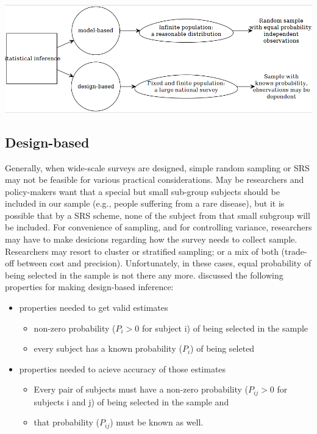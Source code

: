 \documentclass[
]{book}
\providecommand{\tightlist}{%
  \setlength{\itemsep}{0pt}\setlength{\parskip}{0pt}}
\begin{document}
\includegraphics[width=0.85\linewidth]{images/design1}

\hypertarget{design-based}{%
\subsection{Design-based}\label{design-based}}

Generally, when wide-scale surveys are designed, simple random sampling or SRS may not be feasible for various practical considerations. May be researchers and policy-makers want that a special but small sub-group subjects should be included in our sample (e.g., people suffering from a rare disease), but it is possible that by a SRS scheme, none of the subject from that small subgroup will be included. For convenience of sampling, and for controlling variance, researchers may have to make desicions regarding how the survey needs to collect sample. Researchers may resort to cluster or stratified sampling; or a mix of both (trade-off between cost and precision). Unfortunately, in these cases, equal probability of being selected in the sample is not there any more. \citet{lumley2011complex} discussed the following properties for making design-based inference:

\begin{itemize}
\tightlist
\item
  properties needed to get valid estimates

  \begin{itemize}
  \tightlist
  \item
    non-zero probability (\(P_i>0\) for subject i) of being selected in the sample
  \item
    every subject has a known probability (\(P_i\)) of being seleted
  \end{itemize}
\item
  properties needed to acieve accuracy of those estimates

  \begin{itemize}
  \tightlist
  \item
    Every pair of subjects must have a non-zero probability (\(P_{ij}>0\) for subjects i and j) of being selected in the sample and
  \item
    that probability (\(P_{ij}\)) must be known as well.
  \end{itemize}
\end{itemize}
\end{document}
